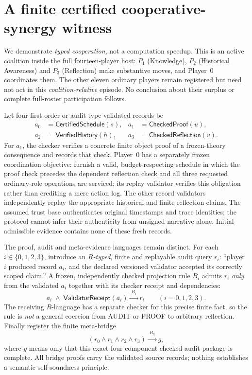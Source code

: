 \documentclass[11pt,letterpaper]{article}
\theoremstyle{definition}
\theoremstyle{plain}
\theoremstyle{definition}
\newcommand{\s}{\mathsf}
\begin{document}
\section{A finite certified cooperative-synergy witness}\label{gl-first-W0-s12}
We demonstrate \emph{typed cooperation}, not a computation speedup. This is an active coalition inside the full fourteen-player host: $P_1$ (Knowledge), $P_2$ (Historical Awareness) and $P_3$ (Reflection) make substantive moves, and Player~0 coordinates them. The other eleven ordinary players remain registered but need not act in this \emph{coalition-relative} episode. No conclusion about their surplus or complete full-roster participation follows.

Let four first-order or audit-type validated records be
\[
\begin{aligned}
 a_0&=\s{CertifiedSchedule}(s),& a_1&=\s{CheckedProof}(u),\\
 a_2&=\s{VerifiedHistory}(h),& a_3&=\s{CheckedReflection}(v).
\end{aligned}
\]
For $a_1$, the checker verifies a concrete finite object proof of a frozen-theory consequence and records that check. Player~0 has a separately frozen coordination objective: furnish a valid, budget-respecting schedule in which the proof check precedes the dependent reflection check and all three requested ordinary-role operations are serviced; its replay validator verifies this obligation rather than crediting a mere action log. The other record validators independently replay the appropriate historical and finite reflection claims. The assumed trust base authenticates original timestamps and trace identities; the protocol cannot infer their authenticity from unsigned narrative alone. Initial admissible evidence contains none of these fresh records.

The proof, audit and meta-evidence languages remain distinct. For each $i\in\{0,1,2,3\}$, introduce an \emph{$R$-typed}, finite and replayable audit query $r_i$: ``player $i$ produced record $a_i$, and the declared versioned validator accepted its correctly scoped claim.'' A frozen, independently checked projection rule $B_i$ admits $r_i$ \emph{only} from the validated $a_i$ together with its checker receipt and dependencies:
\[
  a_i\;\wedge\;\s{ValidatorReceipt}(a_i)\xrightarrow{\;B_i\;} r_i
  \qquad(i=0,1,2,3). \tag{2a}
\]
The receiving $R$-language has a separate checker for this precise finite fact, so the rule is \emph{not} a general coercion from \textsf{AUDIT} or \textsf{PROOF} to arbitrary reflection. Finally register the finite meta-bridge
\[
 (r_0\wedge r_1\wedge r_2\wedge r_3)\xrightarrow{\;B_g\;} g,
 \tag{2b}
\]
where $g$ means only that this exact four-component checked audit package is complete. All bridge proofs carry the validated source records; nothing establishes a semantic self-soundness principle.
\end{document}
